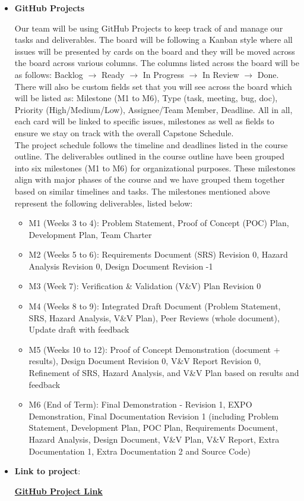 \documentclass{article}
\begin{document}
\begin{itemize}
 \item \textbf{GitHub Projects}
 
Our team will be using GitHub Projects to keep track of and manage our tasks and deliverables. The board will be following a
Kanban style where all issues will be presented by cards on the board and they will be moved across the board across various
columns. The columns listed across the board will be as follows: Backlog $\rightarrow$ Ready $\rightarrow$ In Progress $\rightarrow$
In Review $\rightarrow$ Done. There will
also be custom fields set that you will see across the board which will be listed as: Milestone (M1 to M6), Type (task, meeting,
bug, doc), Priority (High/Medium/Low), Assignee/Team Member, Deadline. All in all, each card will be linked to specific issues,
milestones as well as fields to ensure we stay on track with the overall Capstone Schedule. \\


The project schedule follows the timeline and deadlines listed in the course outline. The deliverables outlined in the course
outline have been grouped into six milestones (M1 to M6) for organizational purposes. These milestones align with major phases of the
course and we have grouped them together based on similar timelines and tasks. The milestones mentioned above represent the
following deliverables, listed below:


 \begin{itemize}
   \item M1 (Weeks 3 to 4): Problem Statement, Proof of Concept (POC) Plan, Development Plan, Team Charter
   \item M2 (Weeks 5 to 6): Requirements Document (SRS) Revision 0, Hazard Analysis Revision 0, Design Document Revision -1
   \item M3 (Week 7): Verification \& Validation (V\&V) Plan Revision 0
   \item M4 (Weeks 8 to 9): Integrated Draft Document (Problem Statement, SRS, Hazard Analysis, V\&V Plan), Peer Reviews (whole document), Update draft with feedback
   \item M5 (Weeks 10 to 12): Proof of Concept Demonstration (document + results), Design Document Revision 0, V\&V Report Revision 0, Refinement of SRS, Hazard Analysis, and V\&V Plan based on results and feedback
   \item M6 (End of Term): Final Demonstration - Revision 1, EXPO Demonstration, Final Documentation Revision 1 (including Problem Statement, Development Plan, POC Plan, Requirements Document, Hazard Analysis, Design Document, V\&V Plan, V\&V Report, Extra Documentation 1, Extra Documentation 2 and Source Code)
 \end{itemize}




 \item \textbf{Link to project}:

 \href{https://github.com/users/M9Huynh/projects/2/views/1}{\textbf{GitHub Project Link}}


\end{itemize}
\end{document}
